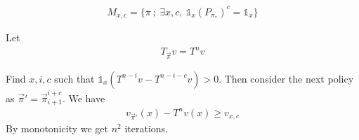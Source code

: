 \documentclass{article}
\def\1{{\mathds 1}}
\begin{document}
\begin{align}
M_{x,c} = \{ \pi ~;~ \exists x,c,~ \1_x (P_{\pi_*})^c=\1_x \}
\end{align}

Let
\begin{align}
  T_{\vec\pi}v = T^n v
\end{align}

Find $x,i,c$ such that $\1_x (T^{n-i}v - T^{n-i-c}v)>0$.
Then consider the next policy as $\vec\pi'=\vec\pi_{i+1}^{i+c}$.
We have
\begin{align}
  v_{\vec\pi'}(x)-T^nv(x) \ge v_{x,c}
\end{align}
By monotonicity we get $n^2$ iterations.
  


\end{document}
